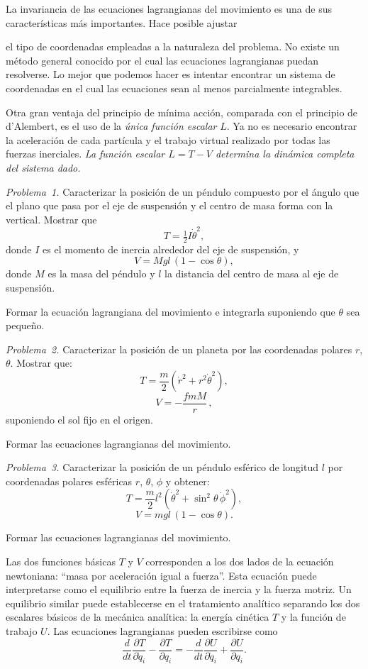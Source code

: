 \documentclass[12pt,a4paper]{book}
\begin{document}
La invariancia de las ecuaciones lagrangianas del movimiento es una de sus características más importantes. Hace posible ajustar


el tipo de coordenadas empleadas a la naturaleza del problema. No existe un método general conocido por el cual las ecuaciones lagrangianas puedan resolverse. Lo mejor que podemos hacer es intentar encontrar un sistema de coordenadas en el cual las ecuaciones sean al menos parcialmente integrables.

Otra gran ventaja del principio de mínima acción, comparada con el principio de d'Alembert, es el uso de la \textit{única función escalar} $L$. Ya no es necesario encontrar la aceleración de cada partícula y el trabajo virtual realizado por todas las fuerzas inerciales. \textit{La función escalar $L = T - V$ determina la dinámica completa del sistema dado.}

\textit{Problema~1.} Caracterizar la posición de un péndulo compuesto por el ángulo que el plano que pasa por el eje de suspensión y el centro de masa forma con la vertical. Mostrar que
\[
T = \tfrac{1}{2} I \dot{\theta}^2,
\]
donde $I$ es el momento de inercia alrededor del eje de suspensión, y
\[
V = M g l \,(1 - \cos\theta),
\]
donde $M$ es la masa del péndulo y $l$ la distancia del centro de masa al eje de suspensión.

Formar la ecuación lagrangiana del movimiento e integrarla suponiendo que $\theta$ sea pequeño.

\textit{Problema~2.} Caracterizar la posición de un planeta por las coordenadas polares $r$, $\theta$. Mostrar que:
\[
T = \frac{m}{2}(\dot{r}^2 + r^2\dot{\theta}^2),
\]
\[
V = -\frac{fmM}{r}\,,
\]
suponiendo el sol fijo en el origen.

Formar las ecuaciones lagrangianas del movimiento.

\textit{Problema~3.} Caracterizar la posición de un péndulo esférico de longitud $l$ por coordenadas polares esféricas $r$, $\theta$, $\phi$ y obtener:
\[
T = \frac{m}{2} l^2 (\dot{\theta}^2 + \sin^2\theta\,\dot{\phi}^2),
\]
\[
V = mgl\,(1 - \cos\theta).
\]

Formar las ecuaciones lagrangianas del movimiento.


Las dos funciones básicas $T$ y $V$ corresponden a los dos lados de la ecuación newtoniana: ``masa por aceleración igual a fuerza''. Esta ecuación puede interpretarse como el equilibrio entre la fuerza de inercia y la fuerza motriz. Un equilibrio similar puede establecerse en el tratamiento analítico separando los dos escalares básicos de la mecánica analítica: la energía cinética $T$ y la función de trabajo $U$. Las ecuaciones lagrangianas pueden escribirse como
\begin{equation}
\frac{d}{dt}\frac{\partial T}{\partial \dot{q}_i} - \frac{\partial T}{\partial q_i} = -\frac{d}{dt}\frac{\partial U}{\partial \dot{q}_i} + \frac{\partial U}{\partial q_i}. \tag{52.2}
\end{equation}
\end{document}
